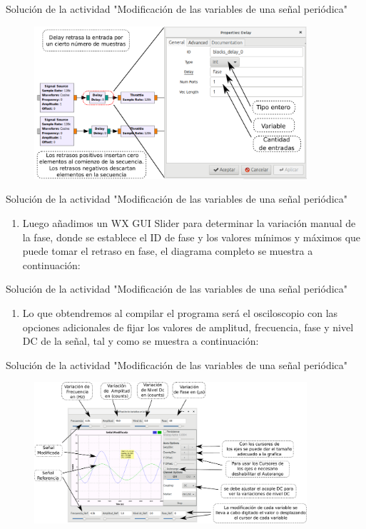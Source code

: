 	\begin{frame}{Solución de la actividad "Modificación de las variables de una señal periódica"}
	\begin{figure}[H]
		\vspace{-3mm}
		\centering
		\includegraphics[width=0.9\textwidth]{soluciones/actividad-1-2/pdf/Delay.pdf}
		\end{figure}
	\end{frame}

	\begin{frame}{Solución de la actividad "Modificación de las variables de una señal periódica"}
	\begin{enumerate}[2.]
	
	\item {Luego añadimos un WX GUI Slider para determinar la variación manual de la fase, donde se establece el ID de fase y los valores mínimos y máximos que puede tomar el retraso en fase, el diagrama completo se muestra a continuación:}\\
	
	\end{enumerate}
	\end{frame}

	
	\begin{frame}{Solución de la actividad "Modificación de las variables de una señal periódica"}
	\begin{enumerate}[3.]
	
	\item {Lo que obtendremos al compilar el programa será el osciloscopio con las opciones adicionales de fijar los valores de amplitud, frecuencia, fase y nivel DC de la señal, tal y como se muestra a continuación:}\\
	
	\end{enumerate}
	\end{frame}

	\begin{frame}{Solución de la actividad "Modificación de las variables de una señal periódica"}
	\begin{figure}[H]
		\vspace{-3mm}
		\centering
		\includegraphics[width=0.9\textwidth]{soluciones/actividad-1-2/pdf/Salida.pdf}
		\end{figure}
	\end{frame}
